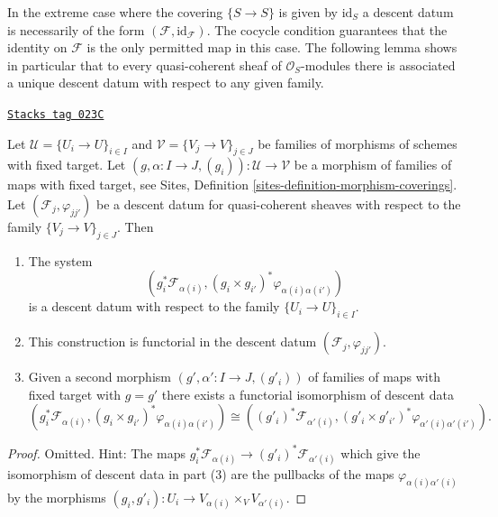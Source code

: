 \medskip\noindent
In the extreme case where the covering $\{S \to S\}$
is given by $\text{id}_S$ a descent datum is necessarily
of the form $(\mathcal{F}, \text{id}_\mathcal{F})$. The cocycle
condition guarantees that the identity on $\mathcal{F}$ is the
only permitted map in this case. The following lemma shows
in particular that to every quasi-coherent sheaf of
$\mathcal{O}_S$-modules there is associated a unique
descent datum with respect to any given family.

\begin{lemma}
\label{descent-lemma-refine-descent-datum}
\href{https://stacks.math.columbia.edu/tag/023C}{\texttt{Stacks tag 023C}}

Let $\mathcal{U} = \{U_i \to U\}_{i \in I}$ and
$\mathcal{V} = \{V_j \to V\}_{j \in J}$
be families of morphisms of schemes with fixed target.
Let $(g, \alpha : I \to J, (g_i)) : \mathcal{U} \to \mathcal{V}$
be a morphism of families of maps with fixed target, see
Sites, Definition \ref{sites-definition-morphism-coverings}.
Let $(\mathcal{F}_j, \varphi_{jj'})$ be a descent
datum for quasi-coherent sheaves with respect to the
family $\{V_j \to V\}_{j \in J}$. Then
\begin{enumerate}
\item The system
$$
\left(g_i^*\mathcal{F}_{\alpha(i)},
(g_i \times g_{i'})^*\varphi_{\alpha(i)\alpha(i')}\right)
$$
is a descent datum with respect to the family $\{U_i \to U\}_{i \in I}$.
\item This construction is functorial in the descent datum
$(\mathcal{F}_j, \varphi_{jj'})$.
\item Given a second morphism $(g', \alpha' : I \to J, (g'_i))$
of families of maps with fixed target with $g = g'$
there exists a functorial isomorphism of descent data
$$
(g_i^*\mathcal{F}_{\alpha(i)},
(g_i \times g_{i'})^*\varphi_{\alpha(i)\alpha(i')})
\cong
((g'_i)^*\mathcal{F}_{\alpha'(i)},
(g'_i \times g'_{i'})^*\varphi_{\alpha'(i)\alpha'(i')}).
$$
\end{enumerate}
\end{lemma}

\begin{proof}
Omitted. Hint: The maps
$g_i^*\mathcal{F}_{\alpha(i)} \to (g'_i)^*\mathcal{F}_{\alpha'(i)}$
which give the isomorphism of descent data in part (3)
are the pullbacks of the maps $\varphi_{\alpha(i)\alpha'(i)}$ by the
morphisms $(g_i, g'_i) : U_i \to V_{\alpha(i)} \times_V V_{\alpha'(i)}$.
\end{proof}

